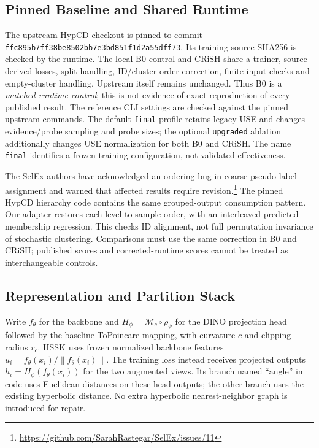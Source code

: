 \documentclass[conference]{IEEEtran}
\newcommand{\code}[1]{\texttt{#1}}
\begin{document}
\subsection{Pinned Baseline and Shared Runtime}
The upstream HypCD checkout is pinned to commit \code{ffc895b7ff38be8502bb7e3bd851f1d2a55dff73}. Its training-source SHA256 is checked by the runtime. The local B0 control and CRiSH share a trainer, source-derived losses, split handling, ID/cluster-order correction, finite-input checks and empty-cluster handling. Upstream itself remains unchanged. Thus B0 is a \emph{matched runtime control}; this is not evidence of exact reproduction of every published result. The reference CLI settings are checked against the pinned upstream commands. The default \code{final} profile retains legacy USE and changes evidence/probe sampling and probe sizes; the optional \code{upgraded} ablation additionally changes USE normalization for both B0 and CRiSH. The name \code{final} identifies a frozen training configuration, not validated effectiveness.

The SelEx authors have acknowledged an ordering bug in coarse pseudo-label assignment and warned that affected results require revision.\footnote{\url{https://github.com/SarahRastegar/SelEx/issues/11}} The pinned HypCD hierarchy code contains the same grouped-output consumption pattern. Our adapter restores each level to sample order, with an interleaved predicted-membership regression. This checks ID alignment, not full permutation invariance of stochastic clustering. Comparisons must use the same correction in B0 and CRiSH; published scores and corrected-runtime scores cannot be treated as interchangeable controls.

\subsection{Representation and Partition Stack}
Write $f_\theta$ for the backbone and $H_\phi=\mathcal M_c\circ\rho_\phi$ for the DINO projection head followed by the baseline ToPoincare mapping, with curvature $c$ and clipping radius $r_c$. HSSK uses frozen normalized backbone features $u_i=f_\theta(x_i)/\|f_\theta(x_i)\|$. The training loss instead receives projected outputs $h_i=H_\phi(f_\theta(x_i))$ for the two augmented views. Its branch named ``angle'' in code uses Euclidean distances on these head outputs; the other branch uses the existing hyperbolic distance. No extra hyperbolic nearest-neighbor graph is introduced for repair.
\end{document}
